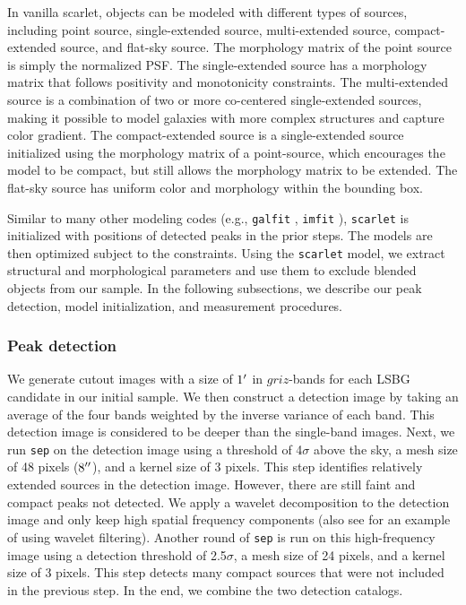 \documentclass[twocolumn,astrosymb,twocolappendix]{aastex631}
\newcommand{\code}[1]{\texttt{#1}}
\begin{document}
\begin{CJK*}{UTF8}{gbsn}
In vanilla scarlet, objects can be modeled with different types of sources, including point source, single-extended source, multi-extended source, compact-extended source, and flat-sky source. The morphology matrix of the point source is simply the normalized PSF. The single-extended source has a morphology matrix that follows positivity and monotonicity constraints. The multi-extended source is a combination of two or more co-centered single-extended sources, making it possible to model galaxies with more complex structures and capture color gradient. The compact-extended source is a single-extended source initialized using the morphology matrix of a point-source, which encourages the model to be compact, but still allows the morphology matrix to be extended. The flat-sky source has uniform color and morphology within the bounding box.

Similar to many other modeling codes (e.g., \code{galfit} \citealt{galfit}, \code{imfit} \citealt{imfit}), \code{scarlet} is initialized with positions of detected peaks in the prior steps. The models are then optimized subject to the constraints. Using the \code{scarlet} model, we extract structural and morphological parameters and use them to exclude blended objects from our sample. In the following subsections, we describe our peak detection, model initialization, and measurement procedures. 

\subsubsection{Peak detection}\label{sec:peak}
We generate cutout images with a size of $1\mbox{$^\prime$}$ in $griz$-bands for each LSBG candidate in our initial sample. We then construct a detection image by taking an average of the four bands weighted by the inverse variance of each band. This detection image is considered to be deeper than the single-band images. 
Next, we run \code{sep} on the detection image using a threshold of 4$\sigma$ above the sky, a mesh size of 48 pixels ($8\mbox{$^{\prime\prime}$}$), and a kernel size of 3 pixels. This step identifies relatively extended sources in the detection image. However, there are still faint and compact peaks not detected. We apply a wavelet decomposition to the detection image \citep{Starck2015} and only keep high spatial frequency components (also see \citealt{Zaritsky2019} for an example of using wavelet filtering). Another round of \code{sep} is run on this high-frequency image using a detection threshold of 2.5$\sigma$, a mesh size of 24 pixels, and a kernel size of 3 pixels. This step detects many compact sources that were not included in the previous step. In the end, we combine the two detection catalogs. 


\end{CJK*}
\end{document}
